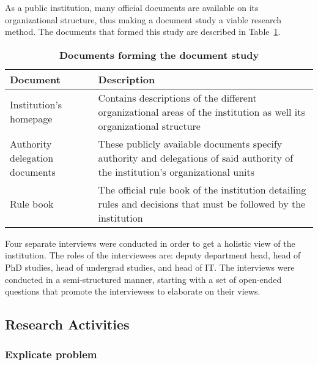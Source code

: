 As a public institution, many official documents are available on its organizational structure, thus making a document study a viable research method. The documents that formed this study are described in Table~\ref{tab:doc_study}.

\begin{table}  
  \begin{tabular}[c]{| p{} |
                       p{} | }
    \hline
    \textbf{Document} & \textbf{Description} \\
    \hline
    Institution's homepage & Contains descriptions of the different organizational areas of the institution as well its organizational structure \\
    \hline
    Authority delegation documents & These publicly available documents specify authority and delegations of said authority of the institution's organizational units \\
    \hline
    Rule book & The official rule book of the institution detailing rules and decisions that must be followed by the institution \\
    \hline
  \end{tabular}
  \caption{\textbf{Documents forming the document study}}
  \label{tab:doc_study}
\end{table}

Four separate interviews were conducted in order to get a holistic view of the institution. The roles of the interviewees are: deputy department head, head of PhD studies, head of undergrad studies, and head of IT. The interviews were conducted in a semi-structured manner, starting with a set of open-ended questions that promote the interviewees to elaborate on their views. 

\subsection{Research Activities}
\subsubsection*{Explicate problem}

